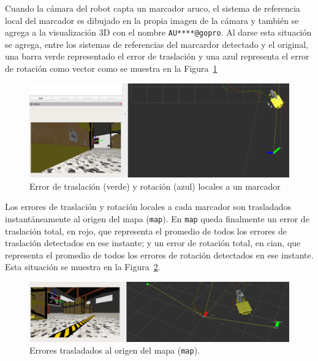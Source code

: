 \documentclass[12pt, a4paper]{report}
\begin{document}
		Cuando la cámara del robot capta un marcador aruco, el sistema de referencia local del marcador es dibujado en la propia imagen de la cámara y también se agrega a la visualización 3D con el nombre \texttt{AU****@gopro}.
		Al darse esta situación se agrega, entre los sistemas de referencias del marcardor detectado y el original, una barra verde representado el error de traslación y una azul representa el error de rotación como vector como se muestra en la Figura~\ref{fig:resultados-errores_locales}

		\begin{figure}[H]
			\centering
			\includegraphics[width=1\linewidth]{img/Captura desde 2024-02-28 11-03-31}
			\caption{Error de traslación (verde) y rotación (azul) locales a un marcador}
			\label{fig:resultados-errores_locales}
		\end{figure}

		Los errores de traslación y rotación locales a cada marcador son trasladados instantáneamente al origen del mapa (\texttt{map}).
		En \texttt{map} queda finalmente un error de traslación total, en rojo, que representa el promedio de todos los errores de traslación detectados en ese instante; y un error de rotación total, en cian, que representa el promedio de todos los errores de rotación detectados en ese instante.
		Esta situación se muestra en la Figura~\ref{fig:resultados-errores_map}.
		\begin{figure}[H]
			\centering
			\includegraphics[width=1\linewidth]{img/Captura desde 2024-02-28 10-47-31}
			\caption{Errores trasladados al origen del mapa (\texttt{map}).}
			\label{fig:resultados-errores_map}
		\end{figure}
\end{document}
